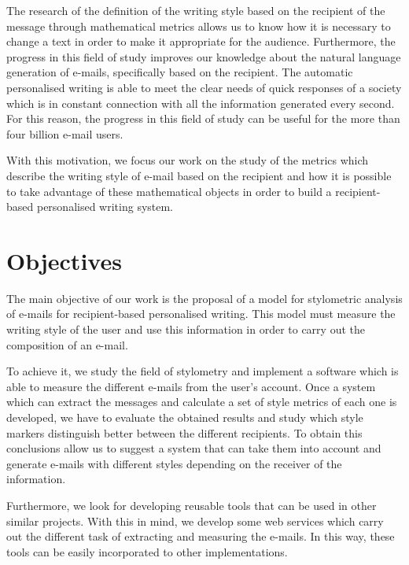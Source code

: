 The research of the definition of the writing style based on the recipient of the message through mathematical metrics allows us to know how it is necessary to change a text in order to make it appropriate for the audience. Furthermore, the progress in this field of study improves our knowledge about the natural language generation of e-mails, specifically based on the recipient. The automatic personalised writing is able to meet the clear needs of quick responses of a society which is in constant connection with all the information generated every second. For this reason, the progress in this field of study can be useful for the more than four billion e-mail users.

With this motivation, we focus our work on the study of the metrics which describe the writing style of e-mail based on the recipient and how it is possible to take advantage of these mathematical objects in order to build a recipient-based personalised writing system.

\section{Objectives}\label{sect:obj}
The main objective of our work is the proposal of a model for stylometric analysis of e-mails for recipient-based personalised writing. This model must measure the writing style of the user and use this information in order to carry out the composition of an e-mail.

To achieve it, we study the field of stylometry and implement a software which is able to measure the different e-mails from the user's account. Once a system which can extract the messages and calculate a set of style metrics of each one is developed, we have to evaluate the obtained results and study which style markers distinguish better between the different recipients. To obtain this conclusions allow us to suggest a system that can take them into account and generate e-mails with different styles depending on the receiver of the information.

Furthermore, we look for developing reusable tools that can be used in other similar projects. With this in mind, we develop some web services which carry out the different task of extracting and measuring the e-mails. In this way, these tools can be easily incorporated to other implementations.

